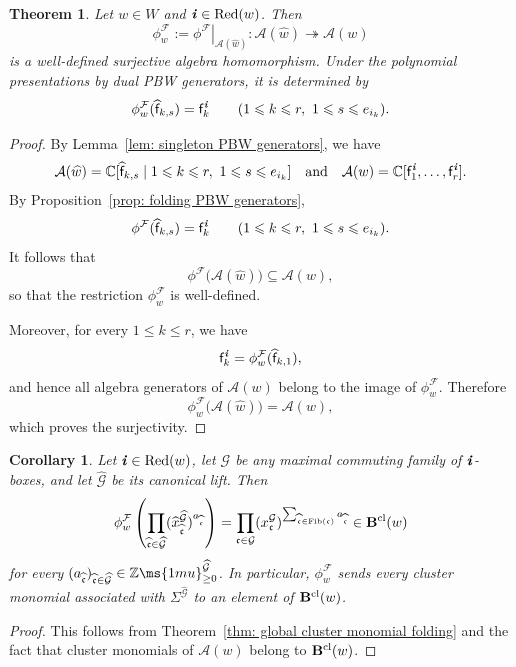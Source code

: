 \documentclass[12pt, leqno]{amsart}
\numberwithin{equation}{section}
\theoremstyle{plain}
\newtheorem{theorem}[lemma]{Theorem}
\newtheorem{corollary}[lemma]{Corollary}
\theoremstyle{definition}
\renewcommand{\le}{\leqslant}
\newcommand{\seteq}{\mathbin{:=}}
\newcommand{\C}{\mathbb{C}}
\newcommand{\Z}{\mathbb{Z}\ms{1mu}}
\newcommand{\ii}{ \textbf{\textit{i}}}
\newcommand{\Fib}{\operatorname{Fib}}
\newcommand{\hw}{\widehat{w}}
\newcommand{\hx}{\widehat{x}}
\newcommand{\frakc}{\mathfrak{c}}
\newcommand{\hfrakc}{\widehat{\frakc}}
\newcommand{\sff}{\mathsf{f}}
\newcommand{\hsff}{\widehat{\sff}}
\newcommand{\bfB}{\mathbf{B}}
\newcommand{\calA}{\mathcal{A}}
\newcommand{\calF}{\mathcal{F}}
\newcommand{\calG}{\mathcal{G}}
\newcommand{\hcalG}{{\widehat{\calG}}}
\newcommand{\qtq}[1][{and}]{\quad\text{{#1}}\quad}
\newcommand{\Red}{\mathrm{Red}}
\begin{document}
\begin{theorem}\label{thm: reduced cluster algebra folding}
Let $w\in W$ and $\ii\in\Red(w)$.  Then
\[
\phi^\calF_w
\seteq
\left.\phi^\calF\right|_{\calA(\hw)}:
\calA(\hw)\twoheadrightarrow\calA(w)
\]
is a well-defined surjective algebra homomorphism.  Under the
polynomial presentations by dual PBW generators, it is determined by
\[
\phi^\calF_w(\hsff_{k,s})=\sff_k^\ii
\qquad
(1\le k\le r,\ 1\le s\le e_{i_k}).
\]
\end{theorem}

\begin{proof}
By Lemma~\ref{lem: singleton PBW generators}, we have
\[
\calA(\hw) = \C[\hsff_{k,s}\mid 1\le k\le r,\ 1\le s\le e_{i_k}]
\qtq
\calA(w) = \C[\sff_1^\ii,\ldots,\sff_r^\ii].
\]
By Proposition~\ref{prop: folding PBW generators},
\[
\phi^\calF(\hsff_{k,s}) = \sff_k^\ii \qquad (1\le k\le r,\ 1\le s\le e_{i_k}).
\]
It follows that
\[
\phi^\calF\bigl(\calA(\hw)\bigr) \subseteq \calA(w),
\]
so that the restriction $\phi^\calF_w$ is well-defined.

Moreover, for every $1\le k\le r$, we have
\[
\sff_k^\ii = \phi^\calF_w(\hsff_{k,1}),
\]
and hence all algebra generators of $\calA(w)$ belong to the image of
$\phi^\calF_w$. Therefore
\[
\phi^\calF_w\bigl(\calA(\hw)\bigr) = \calA(w),
\]
which proves the surjectivity.
\end{proof}

\begin{corollary}
\label{cor: classical dual canonical basis folding}
Let $\ii\in\Red(w)$, let $\calG$ be any maximal commuting family of
$\ii$-boxes, and let $\hcalG$ be its canonical lift. Then
\[
\phi^\calF_w \left(\prod_{\hfrakc\in\hcalG} (\hx_{\hfrakc}^{\hcalG})^{a_{\hfrakc}} \right)
= \prod_{\frakc\in\calG} (x_{\frakc}^{\calG})^{ \sum_{\hfrakc\in\Fib(\frakc)}a_{\hfrakc}} \in \bfB^{\rm cl}(w)
\]
for every $(a_{\hfrakc})_{\hfrakc\in\hcalG}\in\Z_{\geq0}^{\hcalG}$.
In particular, $\phi^\calF_w$ sends every cluster monomial associated
with $\Sigma^{\hcalG}$ to an element of $\bfB^{\rm cl}(w)$.
\end{corollary}

\begin{proof}
This follows from Theorem~\ref{thm: global cluster monomial folding}
and the fact that cluster monomials of $\calA(w)$ belong to
$\bfB^{\rm cl}(w)$.
\end{proof}
\end{document}
